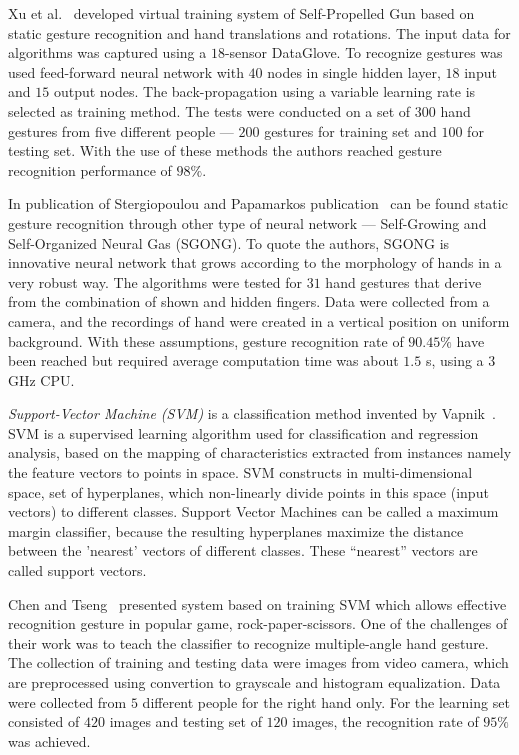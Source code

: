 Xu et al.~\cite{conf/icat/XuYZ06} developed virtual training system of Self-Propelled Gun based on static gesture recognition and hand translations and rotations. The input data for algorithms was captured using a $18$-sensor DataGlove. To recognize gestures was used feed-forward neural network with $40$ nodes in single hidden layer, $18$ input and $15$ output nodes. The back-propagation using a variable learning rate is selected as training method. The tests were conducted on a set of $300$ hand gestures from five different people --- $200$ gestures for training set and $100$ for testing set. With the use of these methods the authors reached gesture recognition performance of $98\%$.

In publication of Stergiopoulou and Papamarkos publication~\cite {Stergiopoulou:2009:HGR:1651923.1651954} can be found static gesture recognition through other type of neural network --- Self-Growing and Self-Organized Neural Gas (SGONG). To quote the authors, SGONG is innovative neural network that grows according to the morphology of hands in a very robust way. The algorithms were tested for $31$ hand gestures that derive from the combination of shown and hidden fingers. Data were collected from a camera, and the recordings of hand were created in a vertical position on uniform background. With these assumptions, gesture recognition rate of $90.45\%$ have been reached but required average computation time was about $1.5$ s, using a $3$ GHz CPU.

\emph{Support-Vector Machine (SVM)} is a classification method invented by Vapnik~\cite{Cortes:SVM}. SVM is a supervised learning algorithm used for classification and regression analysis, based on the mapping of characteristics extracted from instances namely the feature vectors to points in space. SVM constructs in multi-dimensional space, set of hyperplanes, which non-linearly divide points in this space (input vectors) to different classes. Support Vector Machines can be called a maximum margin classifier, because the resulting hyperplanes maximize the distance between the ’nearest’ vectors of different classes. These ``nearest'' vectors are called support vectors.

Chen and Tseng~\cite{ChenDeveloping} presented system based on training SVM which allows effective recognition gesture in popular game, rock-paper-scissors. One of the challenges of their work was to teach the classifier to recognize multiple-angle hand gesture. The collection of training and testing data were images from video camera, which are preprocessed using convertion to grayscale and histogram equalization. Data were collected from $5$ different people for the right hand only. For the learning set consisted of $420$ images and testing set of $120$ images, the recognition rate of $95\%$ was achieved.

